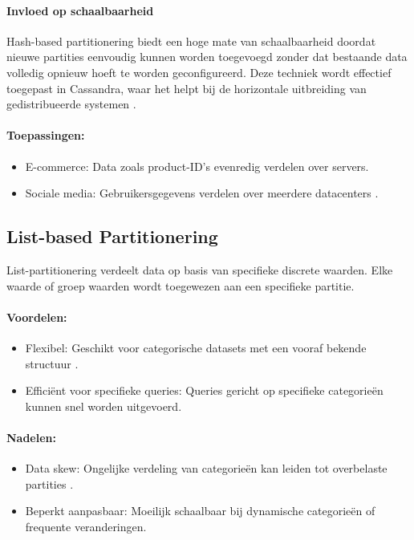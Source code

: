 \paragraph{Invloed op schaalbaarheid} 
Hash-based partitionering biedt een hoge mate van schaalbaarheid doordat nieuwe partities eenvoudig kunnen worden toegevoegd zonder dat bestaande data volledig opnieuw hoeft te worden geconfigureerd. Deze techniek wordt effectief toegepast in Cassandra, waar het helpt bij de horizontale uitbreiding van gedistribueerde systemen \autocite{Mahmud2020}.
 
\paragraph{Toepassingen:}
\begin{itemize}
    \item E-commerce: Data zoals product-ID’s evenredig verdelen over servers.
    \item Sociale media: Gebruikersgegevens verdelen over meerdere datacenters \autocite{Mahmud2020}.
\end{itemize}
 
\subsection{List-based Partitionering}
List-partitionering verdeelt data op basis van specifieke discrete waarden. Elke waarde of groep waarden wordt toegewezen aan een specifieke partitie.
 
\paragraph{Voordelen:}
\begin{itemize}
    \item Flexibel: Geschikt voor categorische datasets met een vooraf bekende structuur \autocite{Mahmud2020}.
    \item Efficiënt voor specifieke queries: Queries gericht op specifieke categorieën kunnen snel worden uitgevoerd.
\end{itemize}
 
\paragraph{Nadelen:}
\begin{itemize}
    \item Data skew: Ongelijke verdeling van categorieën kan leiden tot overbelaste partities \autocite{Mahmud2020}.
    \item Beperkt aanpasbaar: Moeilijk schaalbaar bij dynamische categorieën of frequente veranderingen.
\end{itemize}
 
